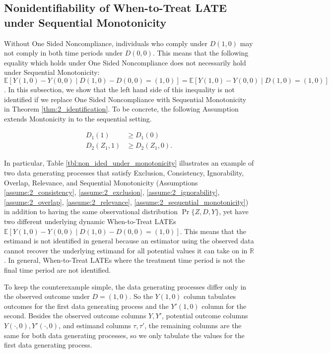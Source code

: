 \subsection{Nonidentifiability of When-to-Treat LATE under Sequential Monotonicity}

Without One Sided Noncompliance, individuals who comply under $D(1,0)$ may not comply in both time periods under $D(0,0)$.
This means that the following equality which holds under One Sided Noncompliance does not necessarily hold under Sequential Monotonicity: 
 $\mathbb{E}[Y(1,0) - Y(0,0) \mid D(1,0)-D(0,0)=(1,0)] = \mathbb{E}[Y(1,0) - Y(0,0) \mid D(1,0)=(1,0)]$.
In this subsection, we show that the left hand side of this inequality is not identified if we replace One Sided Noncompliance with Sequential Monotonicity in Theorem \ref{thm:2_identification}.
To be concrete, the following Assumption extends Montonicity in  \cite{imbens1994identification} to the sequential setting.


\begin{assumption}\label{assume:2_sequential_monotonicity}
\begin{align*}
D_1(1) &\geq D_1(0) \\ 
D_2(Z_1, 1) &\geq D_2(Z_1, 0).
\end{align*}
\end{assumption}



In particular, Table \ref{tbl:non_ided_under_monotonicity} illustrates an example of two data generating processes that satisfy Exclusion, Consistency, Ignorability, Overlap, Relevance, and Sequential Monotonicity (Assumptions \ref{assume:2_consistency}, \ref{assume:2_exclusion}, \ref{assume:2_ignorability}, \ref{assume:2_overlap}, \ref{assume:2_relevance}, \ref{assume:2_sequential_monotonicity}) in addition to having the same observational distribution $\Pr\{Z, D, Y\}$, yet have two different underlying dynamic When-to-Treat LATEs $\mathbb{E}[Y(1,0) - Y(0,0) \mid D(1,0)-D(0,0)=(1,0)]$.
This means that the estimand is not identified in general because an estimator using the observed data cannot recover the underlying estimand for all potential values it can take on in $\mathbb{R}$.
In general, When-to-Treat LATEs where the treatment time period is not the final time period are not identified.

To keep the counterexample simple, the data generating processes differ only in the observed outcome under $D=(1,0)$. So the $Y(1,0)$ column tabulates outcomes for the first data generating process and the $Y'(1,0)$ column for the second.
Besides the observed outcome columns $Y,Y'$, potential outcome columns $Y(\cdot, 0), Y'(\cdot, 0)$, and estimand columns $\tau, \tau'$, the remaining columns are the same for both data generating processes, so we only tabulate the values for the first data generating process.

